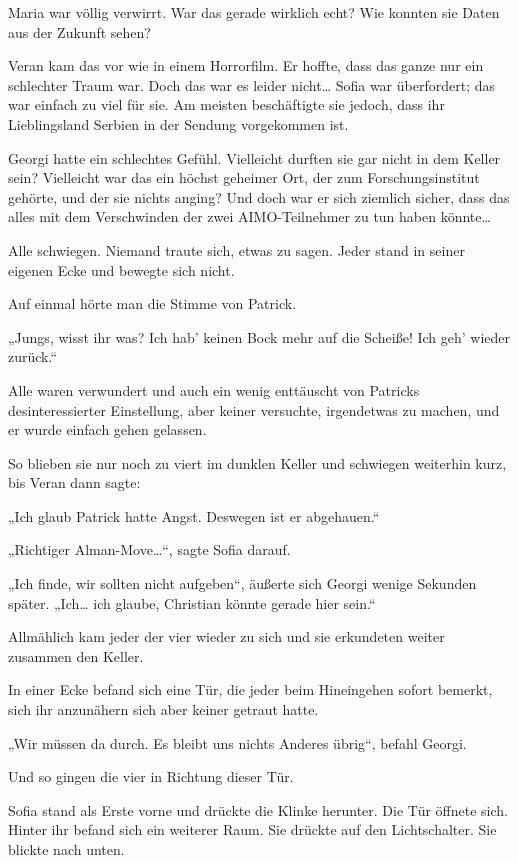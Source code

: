 \documentclass[oneside]{memoir}
\begin{document}
Maria war völlig verwirrt. War das gerade wirklich echt? Wie konnten sie Daten aus der Zukunft sehen?

Veran kam das vor wie in einem Horrorfilm. Er hoffte, dass das ganze nur ein schlechter Traum war. Doch das war es leider nicht\ldots{} Sofia war überfordert; das war einfach zu viel für sie. Am meisten beschäftigte sie jedoch, dass ihr Lieblingsland Serbien in der Sendung vorgekommen ist.

Georgi hatte ein schlechtes Gefühl. Vielleicht durften sie gar nicht in dem Keller sein? Vielleicht war das ein höchst geheimer Ort, der zum Forschungsinstitut gehörte, und der sie nichts anging? Und doch war er sich ziemlich sicher, dass das alles mit dem Verschwinden der zwei AIMO-Teilnehmer zu tun haben könnte\ldots

Alle schwiegen. Niemand traute sich, etwas zu sagen. Jeder stand in seiner eigenen Ecke und bewegte sich nicht.

Auf einmal hörte man die Stimme von Patrick.

„Jungs, wisst ihr was? Ich hab' keinen Bock mehr auf die Scheiße! 
Ich geh' wieder zurück.“

Alle waren verwundert und auch ein wenig enttäuscht von Patricks desinteressierter Einstellung, aber keiner versuchte, irgendetwas zu machen, und er wurde einfach gehen gelassen.

\bigskip
So blieben sie nur noch zu viert im dunklen Keller und schwiegen weiterhin kurz, bis Veran dann sagte:

„Ich glaub Patrick hatte Angst. Deswegen ist er abgehauen.“

„Richtiger Alman-Move\ldots“, sagte Sofia darauf.

„Ich finde, wir sollten nicht aufgeben“, äußerte sich Georgi wenige Sekunden später. „Ich\ldots{} ich glaube, Christian könnte gerade hier sein.“

Allmählich kam jeder der vier wieder zu sich und sie erkundeten weiter zusammen den Keller.

In einer Ecke befand sich eine Tür, die jeder beim Hineingehen sofort bemerkt, sich ihr anzunähern sich aber keiner getraut hatte.

„Wir müssen da durch. Es bleibt uns nichts Anderes übrig“, befahl Georgi.

Und so gingen die vier in Richtung dieser Tür.

Sofia stand als Erste vorne und drückte die Klinke herunter. Die Tür öffnete sich. Hinter ihr befand sich ein weiterer Raum. Sie drückte auf den Lichtschalter. Sie blickte nach unten.
\end{document}
